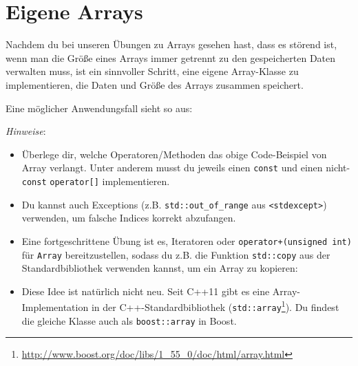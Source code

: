\section{\ExercisePrefixAdvanced Eigene Arrays \optional}
\optionaltextbox
\label{sec:array}
\label{sec:customArrays}

Nachdem du bei unseren Übungen zu Arrays gesehen hast, dass es störend ist, wenn man die Größe eines Arrays immer getrennt zu den gespeicherten Daten verwalten muss, ist ein sinnvoller Schritt, eine eigene Array-Klasse zu implementieren, die Daten und Größe des Arrays zusammen speichert.

Eine möglicher Anwendungsfall sieht so aus:


\emph{Hinweise}:
\begin{itemize}
\item
Überlege dir, welche Operatoren/Methoden das obige Code-Beispiel von Array verlangt.
Unter anderem musst du jeweils einen \lstinline{const} und einen nicht-\lstinline{const} \lstinline{operator[]} implementieren.

\item Du kannst auch Exceptions (z.B. \lstinline{std::out_of_range} aus \lstinline{<stdexcept>}) verwenden, um falsche Indices korrekt abzufangen.

\item Eine fortgeschrittene Übung ist es, Iteratoren oder \lstinline{operator+(unsigned int)} für \lstinline{Array} bereitzustellen, sodass du z.B. die Funktion \lstinline{std::copy} aus der Standardbibliothek verwenden kannst, um ein Array zu kopieren:


\item
Diese Idee ist natürlich nicht neu.
Seit C++11 gibt es eine Array-Implementation in der C++-Standardbibliothek (\lstinline{std::array}\footnote{\url{http://www.boost.org/doc/libs/1_55_0/doc/html/array.html}}).
Du findest die gleiche Klasse auch als \lstinline{boost::array} in Boost.
\end{itemize}
